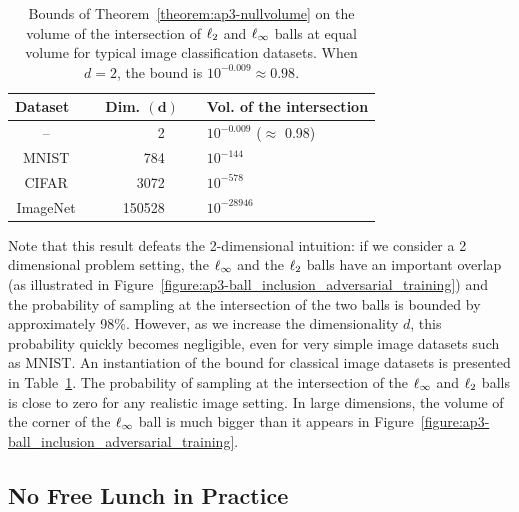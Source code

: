 \begin{table}[ht]
  \centering
  \begin{tabular}{c r r r l}
    \toprule
    \textbf{Dataset\ } & \phantom{....} & \textbf{Dim.} $\mathbf{(d)}$ & \phantom{....} & \textbf{Vol. of the intersection }\\
    \midrule
    -- & & 2\ \ & & $10^{-0.009}$ \quad ($\approx$ 0.98) \\
    MNIST & & 784\ \  & & $10^{-144}$\\
    CIFAR & & 3072\ \ & &  $10^{-578}$\\
    ImageNet & & 150528\ \ & & $10^{-28946}$\\
    \bottomrule
  \end{tabular}
  \caption{ Bounds of Theorem~\ref{theorem:ap3-nullvolume} on the volume of the intersection of  $\ell_2 $ and $\ell_\infty $ balls at equal volume for typical image classification datasets. When $d=2$, the bound is $ 10^{-0.009}\approx 0.98$.}
  \label{table:ap3-datadim}
\end{table}

Note that this result defeats the 2-dimensional intuition: if we consider a 2 dimensional problem setting, the $\ell_\infty $ and the $\ell_2 $ balls have an important overlap (as illustrated in Figure~\ref{figure:ap3-ball_inclusion_adversarial_training}) and the probability of sampling at the intersection of the two balls is bounded by approximately 98\%.
However, as we increase the dimensionality $d$, this probability quickly becomes negligible, even for very simple image datasets such as MNIST.
An instantiation of  the bound for classical image datasets is presented in Table~\ref{table:ap3-datadim}.
The probability of sampling at the intersection of the $\ell_\infty $ and $\ell_2 $ balls is close to zero for any realistic image setting.
In large dimensions, the volume of the corner of the $\ell_\infty $ ball is much bigger than it appears in Figure~\ref{figure:ap3-ball_inclusion_adversarial_training}.


\subsection{No Free Lunch in Practice}
\label{subsection:ap3-no_free_lunch_in_practice}

